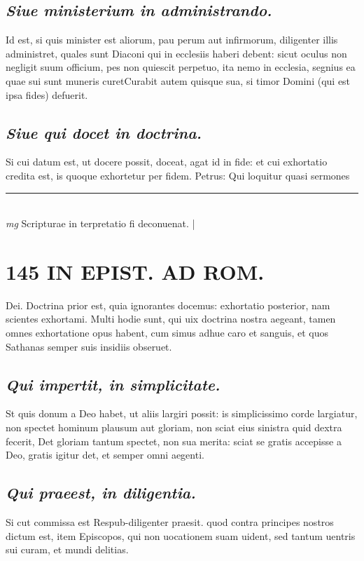 \documentclass{article}
\begin{document}
\begin{pages}
\subsection*{\textit{Siue ministerium in administrando. }}\pstart Id est, si quis minister est aliorum, pau perum aut infirmorum, diligenter illis administret, quales sunt Diaconi qui in ecclesiis haberi debent: sicut oculus non negligit suum officium, pes non quiescit perpetuo, ita nemo in ecclesia, segnius ea quae sui sunt muneris curetCurabit autem quisque sua, si timor Domini (qui est ipsa fides) defuerit.  \pend
{}
{}
\subsection*{\textit{Siue qui docet in doctrina. }}\pstart Si cui datum est, ut docere possit, doceat, agat id in fide: et cui exhortatio credita est, is quoque exhortetur per fidem. Petrus: Qui loquitur quasi sermones  \pend
\vspace{0.5cm}\noindent
\vspace{0.2cm}\rule{1cm}{0.2pt}\\ 
\hspace{0.2cm}\textit{mg}
\footnotesize Scripturae in terpretatio fi deconuenat. 
\normalsize| 
\section*{145 IN EPIST. AD ROM.  }
\marginpar{[ p.]}\pstart Dei. Doctrina prior est, quia ignorantes docemus: exhortatio posterior, nam scientes exhortami. Multi hodie sunt, qui uix doctrina nostra aegeant, tamen omnes exhortatione opus habent, cum simus adhue caro et sanguis, et quos Sathanas semper suis insidiis obseruet.   \pend
{}
{}
\subsection*{\textit{Qui impertit, in simplicitate. }}\pstart St quis donum a Deo habet, ut aliis largiri possit: is simplicissimo corde largiatur, non spectet hominum plausum aut gloriam, non sciat eius sinistra quid dextra fecerit, Det gloriam tantum spectet, non sua merita: sciat se gratis accepisse a Deo, gratis igitur det, et semper omni aegenti.   \pend
{}
{}
\subsection*{\textit{Qui praeest, in diligentia. }}\pstart Si cut commissa est Respub-diligenter praesit. quod contra principes nostros dictum est, item Episcopos, qui non uocationem suam uident, sed tantum uentris sui curam, et mundi delitias.  \pend
{}
{}

\end{pages}
\end{document}
